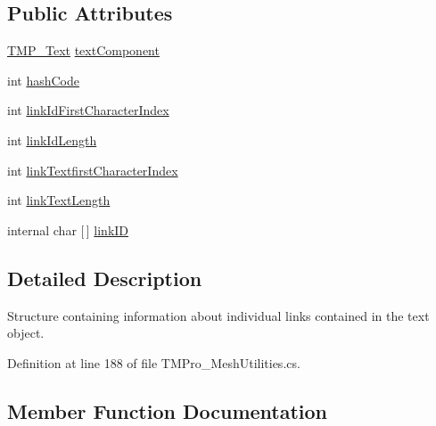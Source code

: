 \subsection*{Public Attributes}
\begin{DoxyCompactItemize}
\item 
\mbox{\hyperlink{class_t_m_pro_1_1_t_m_p___text}{T\+M\+P\+\_\+\+Text}} \mbox{\hyperlink{struct_t_m_pro_1_1_t_m_p___link_info_ab50877c1874c0051b0846003062139e5}{text\+Component}}
\item 
int \mbox{\hyperlink{struct_t_m_pro_1_1_t_m_p___link_info_a1de6d96b1c5691402ed7b14765e6bef7}{hash\+Code}}
\item 
int \mbox{\hyperlink{struct_t_m_pro_1_1_t_m_p___link_info_afe2a8c88271d753ac2d4bd30dc94d88f}{link\+Id\+First\+Character\+Index}}
\item 
int \mbox{\hyperlink{struct_t_m_pro_1_1_t_m_p___link_info_adb7d7e21c91375734ca3f8c42a4cbfb0}{link\+Id\+Length}}
\item 
int \mbox{\hyperlink{struct_t_m_pro_1_1_t_m_p___link_info_a402cde2b6f21ba85779652ec013c770a}{link\+Textfirst\+Character\+Index}}
\item 
int \mbox{\hyperlink{struct_t_m_pro_1_1_t_m_p___link_info_a849c7b081aef9237b7e6f713ba53aff7}{link\+Text\+Length}}
\item 
internal char \mbox{[}$\,$\mbox{]} \mbox{\hyperlink{struct_t_m_pro_1_1_t_m_p___link_info_a4d4525004e3b9db0d88189809cbc80be}{link\+ID}}
\end{DoxyCompactItemize}


\subsection{Detailed Description}
Structure containing information about individual links contained in the text object. 



Definition at line 188 of file T\+M\+Pro\+\_\+\+Mesh\+Utilities.\+cs.



\subsection{Member Function Documentation}
\mbox{\label{struct_t_m_pro_1_1_t_m_p___link_info_aab1c52fff84f197d1ab52d9f915c1c03}} 
